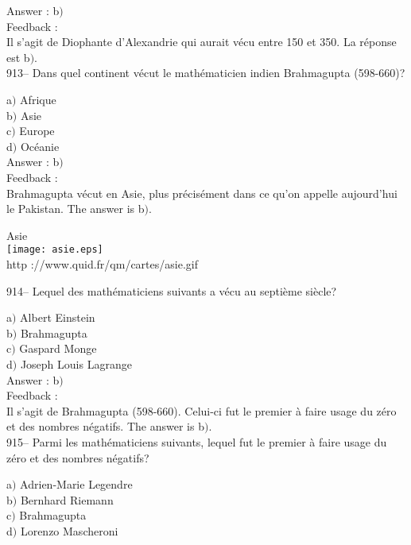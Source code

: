 ﻿\documentclass[letterpaper, 12pt]{article}
\begin{document}
Answer : b$)$\\

Feedback :\\
Il s'agit de Diophante d'Alexandrie qui aurait v\'ecu entre 150 et 350. La
r\'eponse est b$)$.\\

913-- Dans quel continent v\'ecut le math\'ematicien indien
Brahmagupta (598-660)?

a$)$ Afrique \\
b$)$ Asie \\
c$)$ Europe \\
d$)$ Oc\'eanie  \\

Answer : b$)$\\

Feedback : \\
Brahmagupta v\'ecut en Asie, plus pr\'ecis\'ement dans ce qu'on appelle
aujourd'hui le Pakistan. The answer is b$)$.\\

        \begin{center}
        Asie\\
    \texttt{[image: asie.eps]}\\
        {\footnotesize http ://www.quid.fr/qm/cartes/asie.gif}
    \end{center}

914-- Lequel des math\'ematiciens suivants a v\'ecu au septi\`eme
si\`ecle?

a$)$ Albert Einstein \\
b$)$ Brahmagupta \\
c$)$ Gaspard Monge \\
d$)$ Joseph Louis Lagrange\\

Answer : b$)$\\

Feedback : \\
Il s'agit de Brahmagupta (598-660). Celui-ci fut le premier \`a faire usage
du z\'ero et des nombres n\'egatifs. The answer is b$)$.\\

915-- Parmi les math\'ematiciens suivants, lequel fut le premier \`a
faire usage du z\'ero et des nombres n\'egatifs?

a$)$ Adrien-Marie Legendre  \\
b$)$ Bernhard Riemann \\
c$)$ Brahmagupta \\
d$)$ Lorenzo Mascheroni \\
\end{document}
